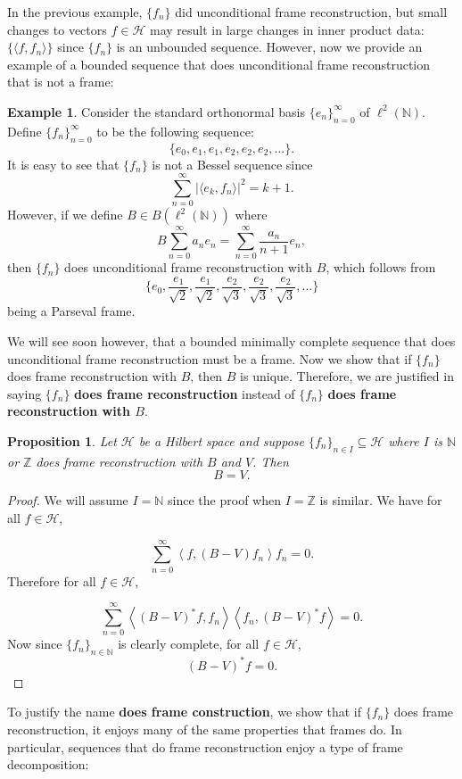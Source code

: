 \documentclass[11pt]{amsart}
\newtheorem{prop}[thm]{Proposition}
\theoremstyle{definition}
\newtheorem{ex}[thm]{Example}
\numberwithin{equation}{section}
\newcommand{\Hcal}{\mathcal{H}} %
\newcommand{\N}{\mathbb{N}}
\begin{document}
In the previous example, $\{f_{n}\}$ did unconditional frame reconstruction, but small changes to vectors $f\in \mathcal{H}$ may result in large changes in inner product data: $\{\langle f, f_n\rangle\}$ since $\{f_n\}$ is an unbounded sequence. However, now we provide an example of a bounded sequence that does unconditional frame reconstruction that is not a frame:
\begin{ex}\label{framereconex2}
Consider the standard orthonormal basis \(\{e_n\}_{n=0}^\infty\) of \(\ell^2(\N)\). Define $\{f_n\}_{n=0}^{\infty}$ to be the following sequence: 
$$\{e_{0}, e_1, e_1, e_2, e_2, e_2,\dots\}.$$
It is easy to see that $\{f_n\}$ is not a Bessel sequence since 
$$\sum_{n=0}^{\infty}|\langle e_{k},f_{n}\rangle|^{2}=k+1.$$
However, if we define $B\in B(\ell^{2}(\mathbb{N}))$ where
$$B\sum_{n=0}^{\infty}a_{n}e_{n}=\sum_{n=0}^\infty \frac{a_n}{n+1} e_n,$$ then $\{f_n\}$ does unconditional frame reconstruction with $B$, which follows from
$$\{e_{0}, \frac{e_1}{\sqrt{2}}, \frac{e_1}{\sqrt{2}}, \frac{e_2}{\sqrt{3}}, \frac{e_2}{\sqrt{3}},\frac{e_2}{\sqrt{3}},\dots\}$$ being a Parseval frame.
\end{ex}
We will see soon however, that a bounded minimally complete sequence that does unconditional frame reconstruction must be a frame. Now we show that if $\{f_{n}\}$ does frame reconstruction with $B$, then $B$ is unique. Therefore, we are justified in saying $\{f_n\}$ \textbf{does frame reconstruction} instead of $\{f_n\}$ \textbf{does frame reconstruction with $B$}.
\begin{prop}
Let $\Hcal$ be a Hilbert space and suppose $\{f_{n}\}_{n\in I}\subseteq \Hcal$ where $I$ is $\mathbb{N}$ or $\mathbb{Z}$ does frame reconstruction with $B$ and $V$. Then $$B=V.$$
\end{prop}
\begin{proof}
We will assume $I=\mathbb{N}$ since the proof when $I=\mathbb{Z}$ is similar.
We have for all $f\in \Hcal$,

\[
\sum_{n=0}^\infty \left\langle f, (B-V)f_n \right\rangle f_n =0.
\]
Therefore for all $f\in \Hcal$,

\[
\sum_{n=0}^\infty \left\langle (B - V)^{*} f, f_n  \right \rangle \left \langle f_n, (B - V)^{*} f  \right\rangle = 0.
\]
Now since $\{f_{n}\}_{n\in \mathbb{N}}$ is clearly complete, for all $f\in \Hcal$,
$$(B-V)^{*}f=0.$$
\end{proof}

To justify the name \textbf{does frame construction}, we show that if $\{f_{n}\}$ does frame reconstruction, it enjoys many of the same properties that frames do. In particular, sequences that do frame reconstruction enjoy a type of frame decomposition:
\end{document}
